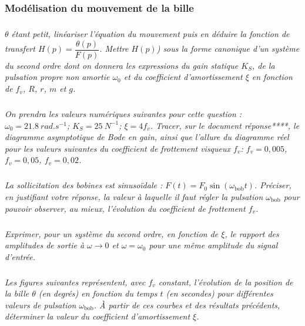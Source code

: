 \documentclass[10pt,fleqn]{article} %
\begin{document}
\subsubsection{Modélisation du mouvement de la bille}

\subparagraph{}\textit{$\theta$ étant petit, linéariser l’équation du mouvement puis en déduire la fonction de transfert $H(p)=\dfrac{\theta(p)}{F(p)}$. Mettre $H(p)$) sous la forme canonique d’un système du second ordre dont on donnera les expressions du gain statique $K_S$, de la pulsation propre non amortie $\omega_0$ et du
coefficient d’amortissement $\xi$ en fonction de $f_v$, $R$, $r$, $m$ et $g$.}

\subparagraph{}\textit{On prendra les valeurs numériques suivantes pour cette question :
$\omega_0 = \SI{21,8}{rad.s^{-1}}$; $K_S = \SI{25}{N^{-1}}$; $\xi=4f_v$.
Tracer, sur le document réponse****, le diagramme asymptotique de Bode en gain, ainsi que l’allure
du diagramme réel pour les valeurs suivantes du coefficient de frottement visqueux $f_v$: $f_v=0,005$, $f_v=0,05$, $f_v=0,02$.}

\subparagraph{}\textit{La sollicitation des bobines est sinusoïdale : $F(t)=F_0 \sin \left( \omega_{\text{bob}}t\right)$. Préciser, en
justifiant votre réponse, la valeur à laquelle il faut régler la pulsation $\omega_{\text{bob}}$ pour pouvoir observer, au mieux, l’évolution du coefficient de frottement $f_v$.}

\subparagraph{}\textit{Exprimer, pour un système du second ordre, en fonction de $\xi$, le rapport des amplitudes de sortie à $\omega \to 0$ et $\omega=\omega_0$ pour une même amplitude du signal d’entrée.}

\subparagraph{}\textit{Les figures suivantes représentent, avec $f_v$ constant, l’évolution de la
position de la bille $\theta$ (en degrés) en fonction du temps $t$ (en secondes)  pour différentes valeurs de pulsation $\omega_{\text{bob}}$. À partir de ces courbes et des résultats précédents, déterminer la valeur du coefficient d’amortissement $\xi$.}
\end{document}
